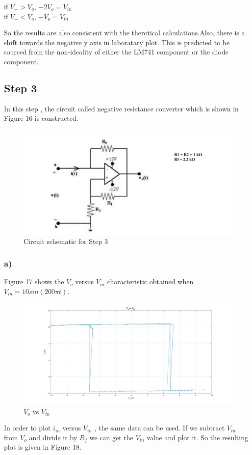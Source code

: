 \documentclass[letterpaper,12pt]{article}
\begin{document}
\begin{center}
if \(V_- > V_o\),  \(-2V_o = V_{in}\) \\
	if \(V_- < V_o\),  \(-V_o = V_{in}\)
\\
\end{center}
So the results are also consistent with the therotical calculations.Also, there is a shift towards the negative y axis in laboratary plot. This is predicted to be sourced from the non-ideality of either the LM741 component or the diode component.
\subsection{Step 3}
In this step , the circuit called negative resistance converter which is shown in Figure 16 is constructed.  
\begin{figure}[H]
	\centering
   \includegraphics[width=1\textwidth]{circuit_5.png}
   \caption{Circuit schematic for Step 3}
\end{figure}

\subsubsection{a)}
Figure 17 shows the \(V_{o}\) versus \(V_{in}\) characteristic obtained when \(V_{in}= 10sin(200\pi t) \).
\begin{figure}[H]
	\centering
   \includegraphics[width=1\textwidth]{3a_1.png}
   \caption{\(V_{o}\) vs \(V_{in}\)}
\end{figure}
In order to plot \(i_{in}\) versus \(V_{in}\) , the same data can be used. If we subtract \(V_{in}\) from \(V_o\) and divide it by \(R_f\) we can get the \(V_{in}\) value and plot it. So the resulting plot is given in Figure 18.
\end{document}
